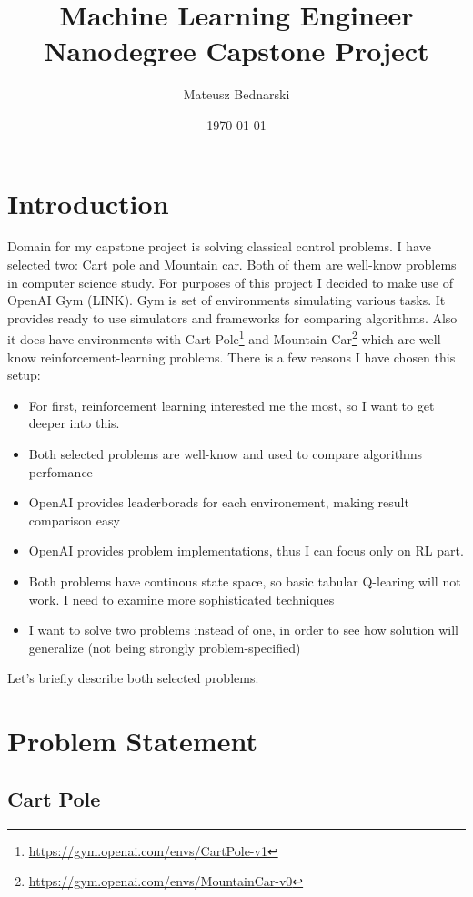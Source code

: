 \documentclass[12pt]{article}
\title{Machine Learning Engineer Nanodegree Capstone Project}
\author{Mateusz Bednarski}
\date{\today}
\begin{document}
\maketitle



\section{Introduction}

Domain for my capstone project is solving classical control problems. I have selected two: Cart pole and Mountain car. Both of them are well-know problems in computer science study. For purposes of this project I decided to make use of OpenAI Gym (LINK). Gym is set of environments simulating various tasks. It provides ready to use simulators and frameworks for comparing algorithms. Also it does have environments with Cart Pole\footnote{\url{https://gym.openai.com/envs/CartPole-v1}} and Mountain Car\footnote{\url{https://gym.openai.com/envs/MountainCar-v0}} which are well-know reinforcement-learning problems. There is a few reasons I have chosen this setup:

\begin{itemize}
\item For first, reinforcement learning interested me the most, so I want to get deeper into this.

\item Both selected problems are well-know and used to compare algorithms perfomance
\item OpenAI provides leaderborads for each environement, making result comparison easy
\item 
OpenAI provides problem implementations, thus I can focus only on RL part.
\item Both problems have continous state space, so basic tabular Q-learing will not work. I need to examine more sophisticated techniques
\item I want to solve two problems instead of one, in order to see how solution will generalize (not being strongly problem-specified)
\end{itemize}


Let's briefly describe both selected problems.

\section{Problem Statement}
\subsection{Cart Pole}
\end{document}
